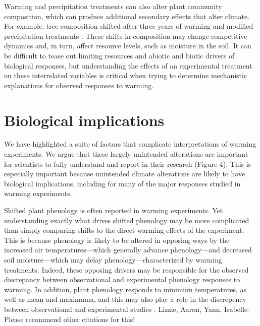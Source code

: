 \documentclass{article}
\begin{document}
\par Warming and precipitation treatments can also alter plant community composition, which can produce additional secondary effects that alter climate. For example, tree composition shifted after three years of warming and modified precipitation treatments \citep{rollinson2012}. These shifts in composition may change competitive dynamics and, in turn, affect resource levels, such as moisture in the soil.  It can be difficult to tease out limiting resources and abiotic and biotic drivers of biological responses, but understanding the effects of an experimental treatment on these interrelated variables is critical when trying to determine mechanistic explanations for observed responses to warming. %

\section* {Biological implications}
\par We have highlighted a suite of factors that complicate interpretations of warming experiments. We argue that these largely unintended alterations are important for scientists to fully understand and report in their research (Figure 4). This is especially important because unintended climate alterations are likely to have biological implications, including for many of the major responses studied in warming experiments.

\par Shifted plant phenology is often reported in warming experiments. Yet understanding exactly what drives shifted phenology may be more complicated than simply comparing shifts to the direct warming effects of the experiment. This is because phenology is likely to be altered in opposing ways by the increased air temperatures---which generally advance phenology---and decreased soil moisture---which may delay phenology---characterized by warming treatments. Indeed, these opposing drivers may be responsible for the observed discrepancy between observational and experimental phenology responses to warming\citep{wolkovich2012}. In addition, plant phenology responds to minimum temperatures, as well as mean and maximuma, and this may also play a role in the discrepency between observational and experimental studies \citep{shen2016,matthews2016}. Lizzie, Aaron, Yann, Isabelle-Please recommend other citations for this! %
\end{document}

